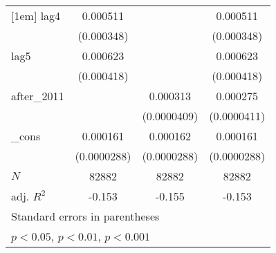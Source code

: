 {\begin{tabular}{l*{3}{c}}
[1em]
lag4        &    0.000511         &                     &    0.000511         \\
            &  (0.000348)         &                     &  (0.000348)         \\
[1em]
lag5        &    0.000623         &                     &    0.000623         \\
            &  (0.000418)         &                     &  (0.000418)         \\
[1em]
after\_2011  &                     &    0.000313\sym{***}&    0.000275\sym{***}\\
            &                     & (0.0000409)         & (0.0000411)         \\
[1em]
\_cons      &    0.000161\sym{***}&    0.000162\sym{***}&    0.000161\sym{***}\\
            & (0.0000288)         & (0.0000288)         & (0.0000288)         \\
\hline
\(N\)       &       82882         &       82882         &       82882         \\
adj. \(R^{2}\)&      -0.153         &      -0.155         &      -0.153         \\
\hline\hline
\multicolumn{4}{l}{\footnotesize Standard errors in parentheses}\\
\multicolumn{4}{l}{\footnotesize \sym{*} \(p<0.05\), \sym{**} \(p<0.01\), \sym{***} \(p<0.001\)}\\
\end{tabular}
}
